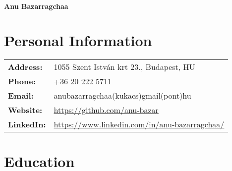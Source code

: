 \documentclass[11pt,a4paper]{article}
\begin{document}
\begin{center}
    \huge\textbf{Anu Bazarragchaa}
\end{center}

\section*{Personal Information}

\begin{tabular}{l l}
    \textbf{Address:} & 1055 Szent István krt 23., Budapest, HU \\
    \textbf{Phone:} & +36 20 222 5711 \\
    \textbf{Email:} & anubazarragchaa(kukacs)gmail(pont)hu \\
    \textbf{Website:} & \url{https://github.com/anu-bazar} \\
    \textbf{LinkedIn:} & \url{https://www.linkedin.com/in/anu-bazarragchaa/} \\
\end{tabular}

\section*{Education}
\end{document}
